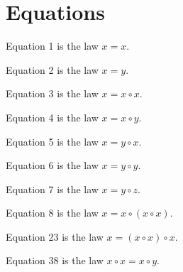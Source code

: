 \chapter{Equations}

\begin{definition}[Equation 1]\label{eq1}\leanok{}  Equation 1 is the law $x=x$.
\end{definition}

\begin{definition}[Equation 2]\label{eq2}\leanok{}  Equation 2 is the law $x=y$.
\end{definition}

\begin{definition}[Equation 3]\label{eq3}\leanok{}  Equation 3 is the law $x=x \circ x$.
\end{definition}

\begin{definition}[Equation 4]\label{eq4}\leanok{}  Equation 4 is the law $x=x \circ y$.
\end{definition}

\begin{definition}[Equation 5]\label{eq5}\leanok{}  Equation 5 is the law $x=y \circ x$.
\end{definition}

\begin{definition}[Equation 6]\label{eq6}\leanok{}  Equation 6 is the law $x=y \circ y$.
\end{definition}

\begin{definition}[Equation 7]\label{eq7}\leanok{}  Equation 7 is the law $x=y \circ z$.
\end{definition}

\begin{definition}[Equation 8]\label{eq8}\leanok{}  Equation 8 is the law $x=x \circ (x \circ x)$.
\end{definition}

\begin{definition}[Equation 23]\label{eq23}\leanok{}  Equation 23 is the law $x = (x \circ x) \circ x$.
\end{definition}

\begin{definition}[Equation 38]\label{eq38}\leanok{}  Equation 38 is the law $x \circ x = x \circ y$.
\end{definition}

